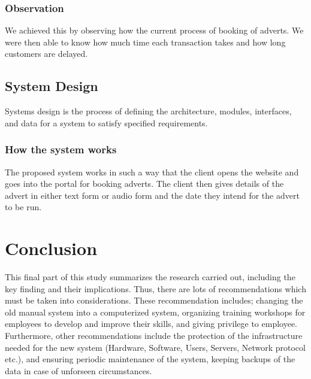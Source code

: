 \documentclass[12pt]{article}
\begin{document}
\subsubsection{Observation}
We achieved this by observing how the current process of booking of adverts. We were then able to know how much time each transaction takes and how long customers are delayed.
\subsection{System Design}
Systems design is the process of defining the architecture, modules, interfaces, and data for a system to satisfy specified requirements.
\subsubsection{How the system works}
The proposed system works in such a way that the client opens the website and goes into the portal for booking adverts. The client then gives details of the advert in either text form or audio form and the date they intend for the advert to be run. 
\section{Conclusion}
This final part of this study summarizes the research carried out, including the key finding and their implications. Thus, there are lots of recommendations which must be taken into considerations. These recommendation includes; changing the old manual system into a computerized system, organizing training workshops for employees to develop and improve their skills, and giving privilege to employee. Furthermore, other recommendations include the protection of the infrastructure needed for the new system (Hardware, Software, Users, Servers, Network protocol etc.), and ensuring periodic maintenance of the system, keeping backups of the data in case of unforseen circumstances.


\end{document}
